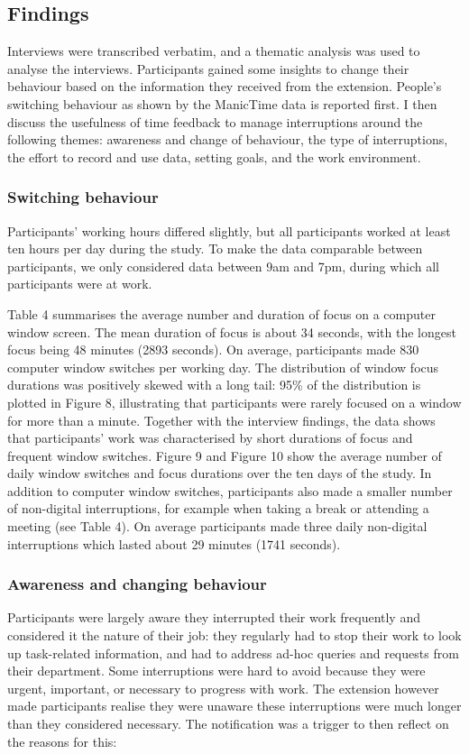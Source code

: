 \subsection{Findings}
Interviews were transcribed verbatim, and a thematic analysis was used to analyse the interviews. Participants gained some insights to change their behaviour based on the information they received from the extension. People’s switching behaviour as shown by the ManicTime data is reported first. I then discuss the usefulness of time feedback to manage interruptions around the following themes: awareness and change of behaviour, the type of interruptions, the effort to record and use data, setting goals, and the work environment.

\subsubsection{Switching behaviour}
Participants’ working hours differed slightly, but all participants worked at least ten hours per day during the study. To make the data comparable between participants, we only considered data between 9am and 7pm, during which all participants were at work. 

Table 4 summarises the average number and duration of focus on a computer window screen. The mean duration of focus is about 34 seconds, with the longest focus being 48 minutes (2893 seconds). On average, participants made 830 computer window switches per working day. The distribution of window focus durations was positively skewed with a long tail: 95\% of the distribution is plotted in Figure 8, illustrating that participants were rarely focused on a window for more than a minute. Together with the interview findings, the data shows that participants’ work was characterised by short durations of focus and frequent window switches. Figure 9 and Figure 10 show the average number of daily window switches and focus durations over the ten days of the study.
In addition to computer window switches, participants also made a smaller number of non-digital interruptions, for example when taking a break or attending a meeting (see Table 4). On average participants made three daily non-digital interruptions which lasted about 29 minutes (1741 seconds). 

\subsubsection{Awareness and changing behaviour}
Participants were largely aware they interrupted their work frequently and considered it the nature of their job: they regularly had to stop their work to look up task-related information, and had to address ad-hoc queries and requests from their department. Some interruptions were hard to avoid because they were urgent, important, or necessary to progress with work. The extension however made participants realise they were unaware these interruptions were much longer than they considered necessary. The notification was a trigger to then reflect on the reasons for this:

